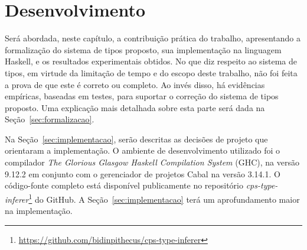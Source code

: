 \chapter{Desenvolvimento}\label{ch:desenvolvimento}

Será abordada, neste capítulo, a contribuição prática do trabalho, apresentando a formalização do sistema de tipos proposto, sua implementação na linguagem Haskell, e os resultados experimentais obtidos.
No que diz respeito ao sistema de tipos, em virtude da limitação de tempo e do escopo deste trabalho, não foi feita a prova de que este é correto ou completo.
Ao invés disso, há evidências empíricas, baseadas em testes, para suportar o correção do sistema de tipos proposto.
Uma explicação mais detalhada sobre esta parte será dada na Seção~\ref{sec:formalizacao}.

Na Seção~\ref{sec:implementacao}, serão descritas as decisões de projeto que orientaram a implementação. 
O ambiente de desenvolvimento utilizado foi o compilador \textit{The Glorious Glasgow Haskell Compilation System} (GHC), na versão 9.12.2 em conjunto com o gerenciador de projetos Cabal na versão 3.14.1.
O código-fonte completo está disponível publicamente no repositório \textit{cps-type-inferer}\footnote{\url{https://github.com/bidinpithecus/cps-type-inferer}} do GitHub.
A Seção~\ref{sec:implementacao} terá um aprofundamento maior na implementação.





